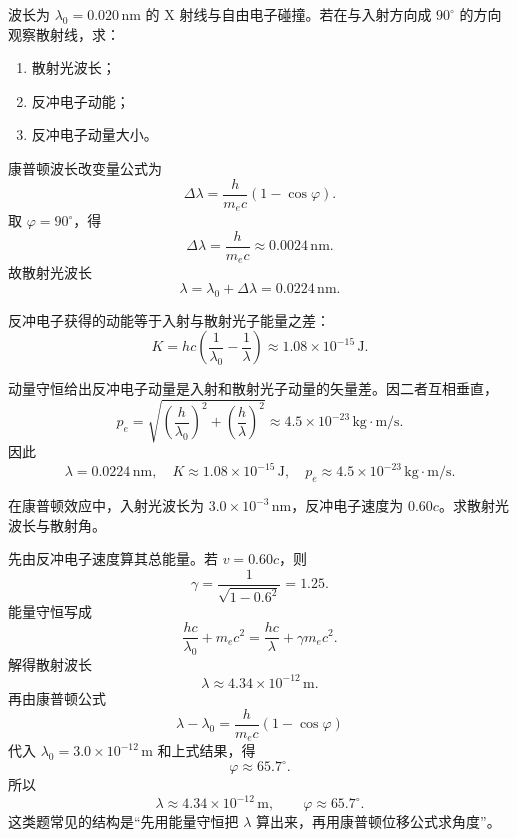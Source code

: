 \documentclass[lang=cn,11pt]{elegantbook}
\begin{document}
\begin{example}
波长为 \(\lambda_0=0.020\,\mathrm{nm}\) 的 X 射线与自由电子碰撞。若在与入射方向成 \(90^\circ\) 的方向观察散射线，求：
\begin{enumerate}
  \item 散射光波长；
  \item 反冲电子动能；
  \item 反冲电子动量大小。
\end{enumerate}
\end{example}

\begin{solution}
康普顿波长改变量公式为
\[
\Delta\lambda=\frac{h}{m_ec}(1-\cos\varphi).
\]
取 \(\varphi=90^\circ\)，得
\[
\Delta\lambda=\frac{h}{m_ec}\approx 0.0024\,\mathrm{nm}.
\]
故散射光波长
\[
\lambda=\lambda_0+\Delta\lambda
=0.0224\,\mathrm{nm}.
\]

反冲电子获得的动能等于入射与散射光子能量之差：
\[
K=hc\left(\frac{1}{\lambda_0}-\frac{1}{\lambda}\right)
\approx 1.08\times 10^{-15}\,\mathrm{J}.
\]

动量守恒给出反冲电子动量是入射和散射光子动量的矢量差。因二者互相垂直，
\[
p_e=\sqrt{\left(\frac{h}{\lambda_0}\right)^2+\left(\frac{h}{\lambda}\right)^2}
\approx 4.5\times 10^{-23}\,\mathrm{kg\cdot m/s}.
\]
因此
\[
\boxed{
\lambda=0.0224\,\mathrm{nm},\quad
K\approx 1.08\times 10^{-15}\,\mathrm{J},\quad
p_e\approx 4.5\times 10^{-23}\,\mathrm{kg\cdot m/s}.
}
\]
\end{solution}

\begin{example}[已知反冲电子速度时反推康普顿散射]
在康普顿效应中，入射光波长为 \(3.0\times 10^{-3}\,\mathrm{nm}\)，反冲电子速度为 \(0.60c\)。求散射光波长与散射角。
\end{example}

\begin{solution}
先由反冲电子速度算其总能量。若 \(v=0.60c\)，则
\[
\gamma=\frac{1}{\sqrt{1-0.6^2}}=1.25.
\]
能量守恒写成
\[
\frac{hc}{\lambda_0}+m_ec^2=\frac{hc}{\lambda}+\gamma m_ec^2.
\]
解得散射波长
\[
\lambda\approx 4.34\times 10^{-12}\,\mathrm{m}.
\]
再由康普顿公式
\[
\lambda-\lambda_0=\frac{h}{m_ec}(1-\cos\varphi)
\]
代入 \(\lambda_0=3.0\times 10^{-12}\,\mathrm{m}\) 和上式结果，得
\[
\varphi\approx 65.7^\circ.
\]
所以
\[
\boxed{
\lambda\approx 4.34\times 10^{-12}\,\mathrm{m},\qquad
\varphi\approx 65.7^\circ.
}
\]
这类题常见的结构是“先用能量守恒把 \(\lambda\) 算出来，再用康普顿位移公式求角度”。
\end{solution}
\end{document}
